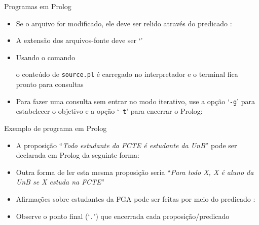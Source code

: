 \begin{frame}[fragile]{Programas em Prolog}

    \begin{itemize}
        \item Se o arquivo for modificado, ele deve ser relido através do predicado 
            :


        \item A extensão dos arquivos-fonte deve ser `'

        \item Usando o comando


        o conteúdo de \texttt{source.pl} é carregado no interpretador e o terminal fica 
        pronto para consultas

        \item Para fazer uma consulta sem entrar no modo iterativo, use a opção `\texttt{-g}'
            para estabelecer o objetivo e a opção `\texttt{-t}' para encerrar o Prolog:


    \end{itemize}

\end{frame}

\begin{frame}[fragile]{Exemplo de programa em Prolog}

    \begin{itemize}
        \item A proposição ``\textit{Todo estudante da FCTE é estudante da UnB}'' pode
            ser declarada em Prolog da seguinte forma:


        \item Outra forma de ler esta mesma proposição seria ``\textit{Para todo X, X é aluno 
            da UnB se X estuda na FCTE}''

        \item Afirmações sobre estudantes da FGA pode ser feitas por meio do predicado
            :

    
        \item Observe o ponto final (`\texttt{.}') que encerrada cada proposição/predicado

    \end{itemize}

\end{frame}

